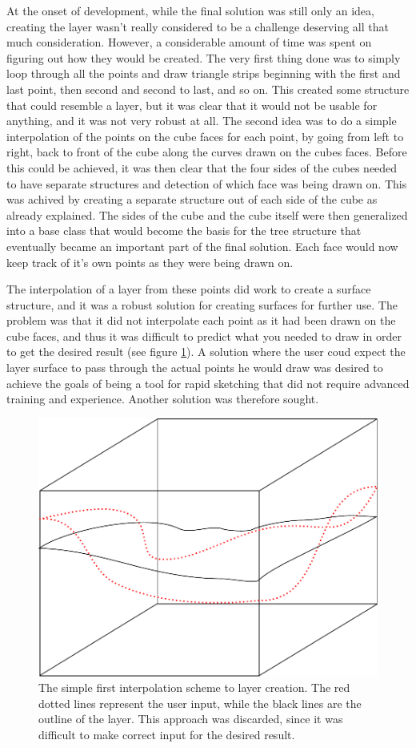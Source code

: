 \documentclass[a4paper,12pt]{report}
\begin{document}
\label{subsec:layers}
At the onset of development, while the final solution was still only an idea, creating the layer wasn't really considered to be a challenge deserving all that much consideration. However, a considerable amount of time was spent on figuring out how they would be created. The very first thing done was to simply loop through all the points and draw triangle strips beginning with the first and last point, then second and second to last, and so on. This created some structure that could resemble a layer, but it was clear that it would not be usable for anything, and it was not very robust at all. The second idea was to do a simple interpolation of the points on the cube faces for each point, by going from left to right, back to front of the cube along the curves drawn on the cubes faces. Before this could be achieved, it was then clear that the four sides of the cubes needed to have separate structures and detection of which face was being drawn on. This was achived by creating a separate structure out of each side of the cube as already explained. The sides of the cube and the cube itself were then generalized into a base class that would become the basis for the tree structure that eventually became an important part of the final solution. Each face would now keep track of it's own points as they were being drawn on.

The interpolation of a layer from these points did work to create a surface structure, and it was a robust solution for creating surfaces for further use. The problem was that it did not interpolate each point as it had been drawn on the cube faces, and thus it was difficult to predict what you needed to draw in order to get the desired result (see figure \ref{fig:layerSimpleInterpol}). A solution where the user coud expect the layer surface to pass through the actual points he would draw was desired to achieve the goals of being a tool for rapid sketching that did not require advanced training and experience. Another solution was therefore sought.

\begin{figure}
 \centering
\includegraphics[width=.75\linewidth]{thesis/layerSimpleInterpol.pdf}
 \caption{The simple first interpolation scheme to layer creation. The red dotted lines represent the user input, while the black lines are the outline of the layer. This approach was discarded, since it was difficult to make correct input for the desired result.}
 \label{fig:layerSimpleInterpol}
\end{figure}
\end{document}
